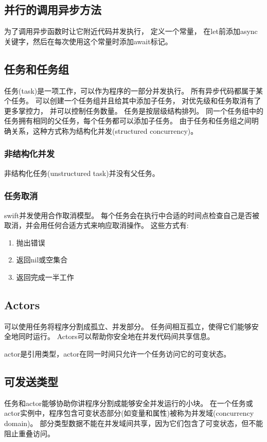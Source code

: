 \documentclass{../main.tex}{subfiles}
\begin{document}
\subsection{并行的调用异步方法}
为了调用异步函数时让它附近代码并发执行，
定义一个常量，
在let前添加async关键字，然后在每次使用这个常量时添加await标记。

\subsection{任务和任务组}
任务(task)是一项工作，可以作为程序的一部分并发执行。
所有异步代码都属于某个任务。
可以创建一个任务组并且给其中添加子任务，
对优先级和任务取消有了更多掌控力，
并可以控制任务数量。
任务是按层级结构排列。
同一个任务组中的任务拥有相同的父任务，每个任务都可以添加子任务。
由于任务和任务组之间明确关系，这种方式称为结构化并发(structured concurrency)。

\subsubsection{非结构化并发}
非结构化任务(unstructured task)并没有父任务。

\subsubsection{任务取消}
swift并发使用合作取消模型。
每个任务会在执行中合适的时间点检查自己是否被取消，并会用任何合适方式来响应取消操作。
这些方式有:
\begin{enumerate}[itemsep=0pt, parsep=0pt, topsep=0pt, partopsep=0pt]
  \item 抛出错误
  \item 返回nil或空集合
  \item 返回完成一半工作
\end{enumerate}

\subsection{Actors}
可以使用任务将程序分割成孤立、并发部分。
任务间相互孤立，使得它们能够安全地同时运行。
Actors可以帮助你安全地在并发代码间共享信息。

actor是引用类型，actor在同一时间只允许一个任务访问它的可变状态。

\subsection{可发送类型}
任务和actor能够协助你讲程序分割成能够安全并发运行的小块。
在一个任务或actor实例中，程序包含可变状态部分(如变量和属性)被称为并发域(concurrency domain)。
部分类型数据不能在并发域间共享，因为它们包含了可变状态，但不能阻止重叠访问。
\end{document}
